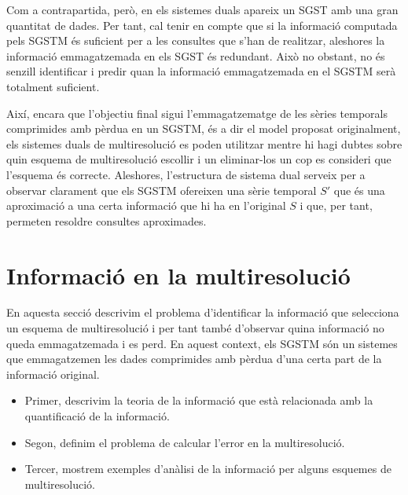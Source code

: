 Com a contrapartida, però, en els sistemes duals apareix un \gls{SGST}
amb una gran quantitat de dades. Per tant, cal tenir en compte que si
la informació computada pels \gls{SGSTM} és suficient per a les
consultes que s'han de realitzar, aleshores la informació
emmagatzemada en els \gls{SGST} és redundant. Això no obstant, no és
senzill identificar i predir quan la informació emmagatzemada en el
\gls{SGSTM} serà totalment suficient.



Així, encara que l'objectiu final sigui l'emmagatzematge de les sèries
temporals comprimides amb pèrdua en un \gls{SGSTM}, és a dir el model
proposat originalment, els sistemes duals de multiresolució es poden
utilitzar mentre hi hagi dubtes sobre quin esquema de multiresolució
escollir i un eliminar-los un cop es consideri que l'esquema és
correcte. Aleshores, l'estructura de sistema dual serveix per a
observar clarament que els \gls{SGSTM} ofereixen una sèrie temporal
$S'$ que és una aproximació a una certa informació que hi ha en
l'original $S$ i que, per tant, permeten resoldre consultes
aproximades.











\section{Informació en la multiresolució}

En aquesta secció descrivim el problema d'identificar la informació
que selecciona un esquema de multiresolució i per tant també
d'observar quina informació no queda emmagatzemada i es perd.  En
aquest context, els \gls{SGSTM} són un sistemes que emmagatzemen les
dades comprimides amb pèrdua d'una certa part de la informació
original.


\begin{itemize}
\item Primer, descrivim la teoria de la informació que està
  relacionada amb la quantificació de la informació.
\item Segon, definim el problema de calcular l'error en la multiresolució.
\item Tercer, mostrem exemples d'anàlisi de la informació per alguns
  esquemes de multiresolució.
\end{itemize}



